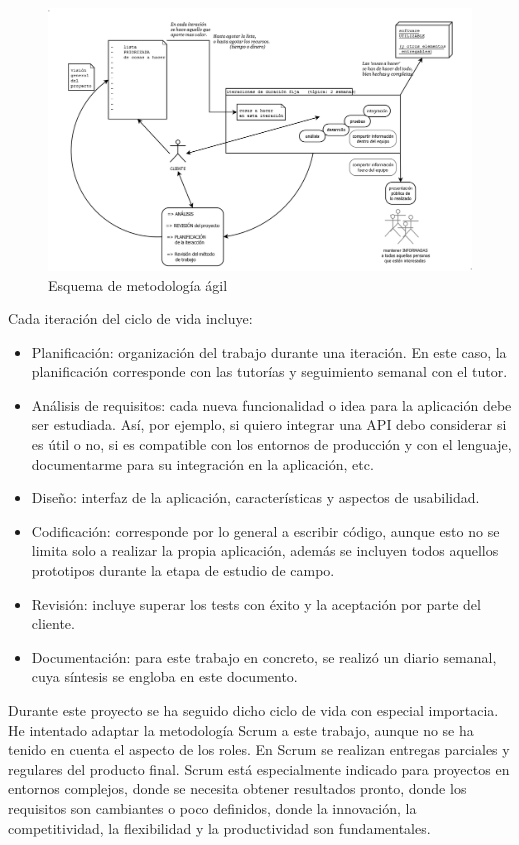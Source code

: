 \begin{figure}[H]
	\centering
	\includegraphics[width=\textwidth]{./images/metodologia-agil.png}
	\caption{Esquema de metodología ágil} \label{fig:metodologia}
\end{figure}

\vspace*{0.1in}
Cada iteración del ciclo de vida incluye:
\begin{itemize}
	\item Planificación: organización del trabajo durante una iteración. En este caso, la planificación corresponde con las tutorías y seguimiento semanal con el tutor.
	\item Análisis de requisitos: cada nueva funcionalidad o idea para la aplicación debe ser estudiada. Así, por ejemplo, si quiero integrar una API debo considerar si es útil o no, si es compatible con los entornos de producción y con el lenguaje, documentarme para su integración en la aplicación, etc.
	\item Diseño: interfaz de la aplicación, características y aspectos de usabilidad.
	\item Codificación: corresponde por lo general a escribir código, aunque esto no se limita solo a realizar la propia aplicación, además se incluyen todos aquellos prototipos durante la etapa de estudio de campo.
	\item Revisión: incluye superar los tests con éxito y la aceptación por parte del cliente.
	\item Documentación: para este trabajo en concreto, se realizó un diario semanal, cuya síntesis se engloba en este documento.
\end{itemize}

Durante este proyecto se ha seguido dicho ciclo de vida con especial importacia. He intentado adaptar la metodología Scrum a este trabajo, aunque no se ha tenido en cuenta  el aspecto de los roles. En Scrum se realizan entregas parciales y regulares del producto final. Scrum está especialmente indicado para proyectos en entornos complejos, donde se necesita obtener resultados pronto, donde los requisitos son cambiantes o poco definidos, donde la innovación, la competitividad, la flexibilidad y la productividad son fundamentales. \\

